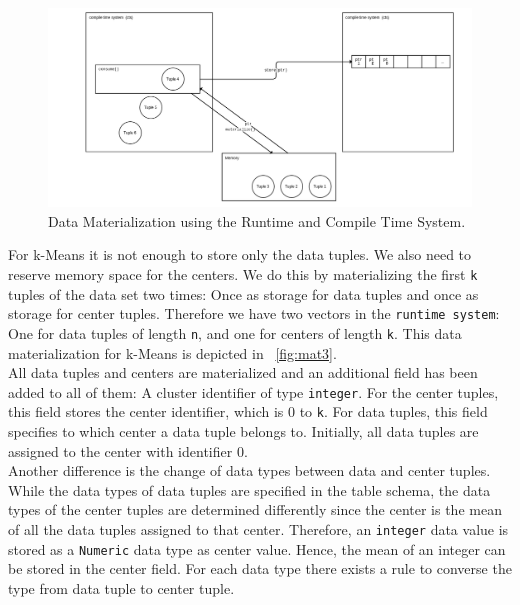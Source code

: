 \begin{figure}[htsb]
  \centering
  \includegraphics[scale=0.25]{figures/mat2}
  \caption[Data Materialization using the Runtime and Compile Time System]{Data Materialization using the Runtime and Compile Time System.}
  \label{fig:mat2}
\end{figure}

For k-Means it is not enough to store only the data tuples. We also need to reserve memory space for the centers. We do this by materializing the first \texttt{k} tuples of the data set two times: Once as storage for data tuples and once as storage for center tuples. Therefore we have two vectors in the \texttt{runtime system}: One for data tuples of length \texttt{n}, and one for centers of length \texttt{k}. This data materialization for k-Means is depicted in ~\autoref{fig:mat3}.
\\ 
All data tuples and centers are materialized and an additional field has been added to all of them: A cluster identifier of type \texttt{integer}. For the center tuples, this field stores the center identifier, which is 0 to \texttt{k}. For data tuples, this field specifies to which center a data tuple belongs to. Initially, all data tuples are assigned to the center with identifier 0. 
\\
Another difference is the change of data types between data and center tuples. While the data types of data tuples are specified in the table schema, the data types of the center tuples are determined differently since the center is the mean of all the data tuples assigned to that center. Therefore, an \texttt{integer} data value is stored as a \texttt{Numeric} data type as center value. Hence, the mean of an integer can be stored in the center field. For each data type there exists a rule to converse the type from data tuple to center tuple.



